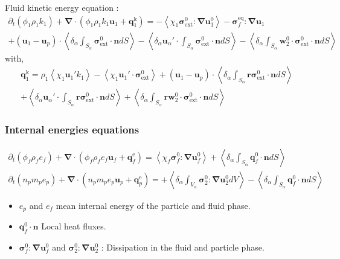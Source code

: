 \documentclass{sintefbeamer}
\newcommand{\avg}[1]{\left<#1\right>}
\newcommand{\pavg}[1]{\left<\delta_\alpha #1\right>}
\newcommand{\pddt}{\partial_t}
\newcommand{\grad}{\mathbf{\nabla}}
\renewcommand{\div}{\mathbf{\nabla}\cdot}
\newcommand{\intO}[1]{\int_{V_\alpha} #1 dV}
\newcommand{\intS}[1]{\int_{S_\alpha} #1 dS}
\newcommand{\pOavg}[1]{\pavg{\intO{#1}}}
\newcommand{\pSavg}[1]{\pavg{\intS{#1}}}
\begin{document}
\begin{frame}
  {Fluid kinetic energy equation :}
  \small
  \begin{multline*}
    \pddt (\phi_1\rho_1k_1)  
    + \div (
      \phi_1\rho_1k_1\textbf{u}_1
      + \textbf{q}_1^\text{k} 
      )
      = 
      - \avg{\chi_1\bm{\sigma}_\text{ext}^0 : \grad \textbf{u}_1^0}
      - \bm{\sigma}_f^\text{eq} : \grad \textbf{u}_1\\
      + (\textbf{u}_1 - \textbf{u}_p)
      \cdot \pSavg{{\bm{\sigma}_\text{ext}^0 \cdot \textbf{n}}}
      - \pavg{ \textbf{u}_\alpha' \cdot \intS{  \bm{\sigma}_\text{ext}^0 \cdot \textbf{n}}}
      - \pavg{ \intS{\textbf{w}_2^0 \cdot \bm{\sigma}_\text{ext}^0 \cdot \textbf{n}}} 
  \end{multline*}
  with, 
  \begin{multline*}
    \textbf{q}_1^\text{k}
      = \rho_1 \avg{\chi_1 \textbf{u}_1' k_1} 
      - \avg{\chi_1 \textbf{u}_1' \cdot \bm{\sigma}_\text{ext}^0}
      + (\textbf{u}_1 - \textbf{u}_p)\cdot
      \pSavg{{\textbf{r}\bm{\sigma}_\text{ext}^0 \cdot \textbf{n}}}\\
      + \pavg{ \textbf{u}_\alpha' \cdot \intS{ \textbf{r} \bm{\sigma}_\text{ext}^0 \cdot \textbf{n}}}
      + \pavg{ \intS{\textbf{r}\textbf{w}_2^0 \cdot \bm{\sigma}_\text{ext}^0 \cdot \textbf{n}}}
  \end{multline*}
\end{frame}


\begin{frame}
  \frametitle{Internal energies equations}
\begin{align*}
  \pddt (\phi_f\rho_fe_f)  
  + \div (
      \phi_f \rho_fe_f\textbf{u}_f
      +
      \textbf{q}_f^\text{e} 
      )
  = 
  \avg{\chi_f\bm{\sigma}_f^0 : \grad \textbf{u}_f^0}
  + \pSavg{{\textbf{q}_f^0 \cdot \textbf{n}}} \\
  \pddt \left(n_p m_p e_p\right)
  + \div \left(n_p
  m_p e_p \textbf{u}_p 
  +  \textbf{q}_p^\text{e}
  \right)
  = 
  + \pOavg{{\bm{\sigma}_2^0 : \grad\textbf{u}_2^0}}
  - \pSavg{{\textbf{q}_f^0\cdot \textbf{n}}}
\end{align*}
  
\begin{itemize}
  \item $e_p$ and $e_f$ mean internal energy of the particle  and fluid phase. 
  \item $\textbf{q}_f^0\cdot \textbf{n}$ Local heat fluxes.
  \item $\bm{\sigma}_f^0 : \grad \textbf{u}_f^0$ and $\bm{\sigma}_2^0 : \grad \textbf{u}_2^0$ : Dissipation in the fluid and particle phase. 
\end{itemize}
\end{frame}
\end{document}
